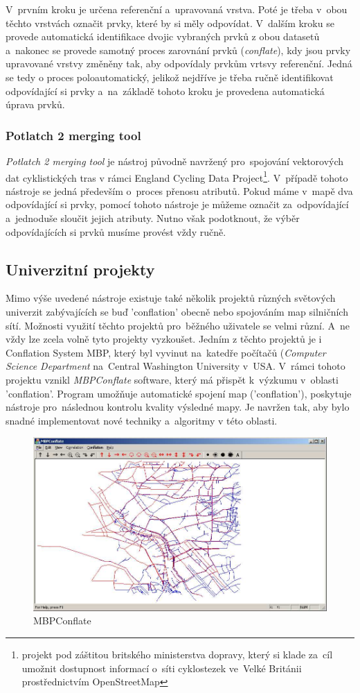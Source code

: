 V~prvním kroku je určena referenční a~upravovaná vrstva. Poté je třeba v~obou těchto vrstvách označit prvky, které by si měly odpovídat. V~dalším kroku se provede automatická
identifikace dvojic vybraných prvků z obou datasetů a~nakonec se provede samotný proces zarovnání prvků (\textit{conflate}), kdy jsou prvky upravované vrstvy změněny tak, 
aby odpovídaly prvkům vrtsvy referenční. Jedná se tedy o proces poloautomatický, jelikož nejdříve je třeba ručně identifikovat odpovídající si prvky a~na~základě tohoto kroku 
je provedena automatická úprava prvků.


\subsubsection{Potlatch 2 merging tool}

\textit{Potlatch 2 merging tool} je nástroj původně navržený pro~spojování vektorových dat cyklistických tras v rámci England Cycling Data Project\footnote{projekt pod záštitou
britského ministerstva dopravy, který si klade za~cíl umožnit dostupnost informací o~síti cyklostezek  ve~Velké Británii prostřednictvím OpenStreetMap}. %
V~případě tohoto nástroje se jedná především o~proces přenosu atributů. Pokud máme v~mapě dva odpovídající si prvky, pomocí tohoto nástroje je můžeme označit za~odpovídající
a~jednoduše sloučit jejich atributy. Nutno však podotknout, že výběr odpovídajících si prvků musíme provést vždy ručně. 


\subsection{Univerzitní projekty}
\label{univerzitní}

Mimo výše uvedené nástroje existuje také několik projektů různých světových univerzit zabývajících se buď 'conflation' obecně nebo spojováním map silničních sítí. Možnosti
využití těchto projektů pro~běžného uživatele se velmi různí. A~ne vždy lze zcela volně tyto projekty vyzkoušet. Jedním z těchto projektů je i Conflation System MBP, který
byl vyvinut na~katedře počítačů (\textit{Computer Science Department} na~Central Washington University v~USA. V~rámci tohoto projektu vznikl \textit{MBPConflate} software,
který má přispět k~výzkumu v~oblasti 'conflation'. Program umožňuje automatické spojení map ('conflation'), poskytuje nástroje pro~následnou kontrolu kvality výsledné mapy.
Je navržen tak, aby bylo snadné implementovat nové techniky a~algoritmy v této oblasti.  

\label{mbppic}
  \begin{figure}[hbt]
    \centering
      \includegraphics[width=350pt]{./pictures/MBPconflate.png}
      \caption{MBPConflate}
      \label{fig:mbp}
  \end{figure}
